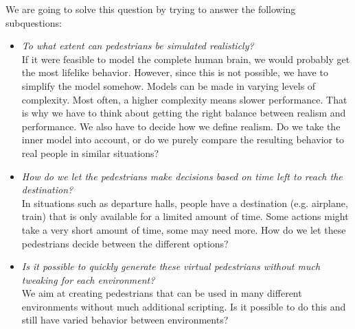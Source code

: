 \documentclass[11pt]{article}
\begin{document}
We are going to solve this question by trying to answer the following subquestions:
\begin{itemize}
\item \emph{To what extent can pedestrians be simulated realisticly?}\\
If it were feasible to model the complete human brain, we would probably get the most lifelike behavior. However, since this is not possible, we have to simplify the model somehow. Models can be made in varying levels of complexity. Most often, a higher complexity means slower performance. That is why we have to think about getting the right balance between realism and performance. We also have to decide how we define realism. Do we take the inner model into account, or do we purely compare the resulting behavior to real people in similar situations?

\item \emph{How do we let the pedestrians make decisions based on time left to reach the destination?}\\
In situations such as departure halls, people have a destination (e.g. airplane, train) that is only available for a limited amount of time. Some actions might take a very short amount of time, some may need more. How do we let these pedestrians decide between the different options?


\item \emph{Is it possible to quickly generate these virtual pedestrians without much tweaking for each environment?}\\
We aim at creating pedestrians that can be used in many different environments without much additional scripting. Is it possible to do this and still have varied behavior between environments?
\end{itemize}
\end{document}
